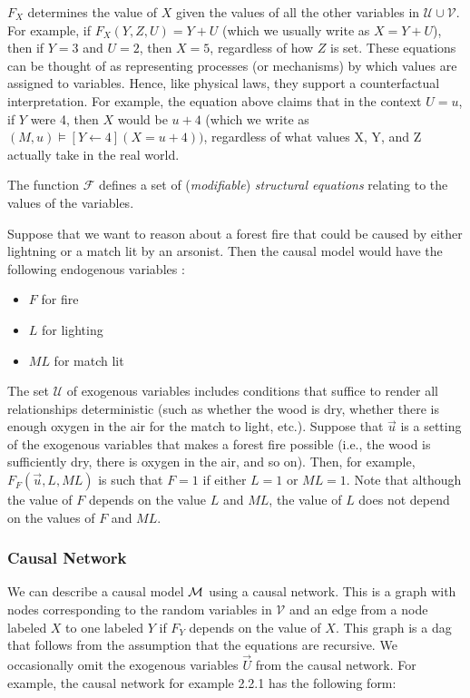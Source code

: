 $F_X$ determines the value of $X$ given the values of all the other variables
in $\mathcal{U}\cup \mathcal{V}$.
For example, if $F_X(Y,Z,U)=Y+U$ (which we usually write as $X = Y + U$),
then if $Y=3$ and $U=2$, then $X = 5$, regardless of how $Z$ is set.
These equations can be thought of as representing processes (or mechanisms) by which values are assigned to variables. Hence, like physical laws, they support a counterfactual interpretation.
For example, the equation above claims that in the context $U=u$, if $Y$ were 4, then $X$ would be $u+4$ (which we write as $(M,u) \models [Y\leftarrow 4](X = u + 4))$, regardless of what values X, Y, and Z actually take in the real world.


The function $\mathcal{F}$ defines a set of (\textit{modifiable}) \textit{structural equations} relating to the values of the variables.

\begin{example}
    Suppose that we want to reason about a forest fire that could
    be caused by either lightning or a match lit by an arsonist.
    Then the causal model would have the following endogenous variables :
    \begin{itemize}
        \item $F$ for fire
        \item $L$ for lighting
        \item $ML$ for match lit
    \end{itemize}
    The set $\mathcal{U}$ of exogenous variables includes conditions
    that suffice to render all relationships deterministic (such as
    whether the wood is dry, whether there is enough oxygen in the air
    for the match to light, etc.).
    Suppose that $\vec u$ is a setting of the exogenous variables that
    makes a forest fire possible (i.e., the wood is sufficiently dry,
    there is oxygen in the air, and so on).
    Then, for example, $F_F(\vec u, L, ML)$ is such that $F=1$ if either
    $L=1$ or $ML=1$.
    Note that although the value of $F$ depends on the value $L$ and $ML$, the value of $L$ does not depend on the values of $F$ and $ML$.
\end{example}

\subsubsection{Causal Network}
We can describe a causal model $\mathcal{M}$ using a causal network.
This is a graph with nodes corresponding to the random variables
in $\mathcal{V}$ and an edge from a node labeled $X$ to one
labeled $Y$ if $F_Y$ depends on the value of $X$.
This graph is a dag that follows from the assumption that the
equations are recursive.
We occasionally omit the exogenous variables $\vec U$ from the causal network.
For example, the causal network for example 2.2.1 has the following
form:


